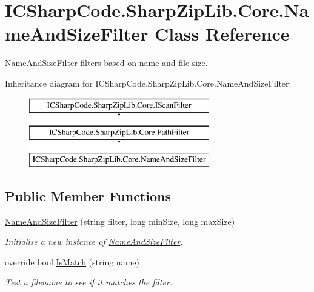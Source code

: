 \hypertarget{class_i_c_sharp_code_1_1_sharp_zip_lib_1_1_core_1_1_name_and_size_filter}{}\section{I\+C\+Sharp\+Code.\+Sharp\+Zip\+Lib.\+Core.\+Name\+And\+Size\+Filter Class Reference}
\label{class_i_c_sharp_code_1_1_sharp_zip_lib_1_1_core_1_1_name_and_size_filter}


\hyperlink{class_i_c_sharp_code_1_1_sharp_zip_lib_1_1_core_1_1_name_and_size_filter}{Name\+And\+Size\+Filter} filters based on name and file size.  


Inheritance diagram for I\+C\+Sharp\+Code.\+Sharp\+Zip\+Lib.\+Core.\+Name\+And\+Size\+Filter\+:\begin{figure}[H]
\begin{center}
\leavevmode
\includegraphics[height=3.000000cm]{class_i_c_sharp_code_1_1_sharp_zip_lib_1_1_core_1_1_name_and_size_filter}
\end{center}
\end{figure}
\subsection*{Public Member Functions}
\begin{DoxyCompactItemize}
\item 
\hyperlink{class_i_c_sharp_code_1_1_sharp_zip_lib_1_1_core_1_1_name_and_size_filter_a79b6320156041b90e0b8d863cb78217b}{Name\+And\+Size\+Filter} (string filter, long min\+Size, long max\+Size)
\begin{DoxyCompactList}\small\item\em Initialise a new instance of \hyperlink{class_i_c_sharp_code_1_1_sharp_zip_lib_1_1_core_1_1_name_and_size_filter}{Name\+And\+Size\+Filter}. \end{DoxyCompactList}\item 
override bool \hyperlink{class_i_c_sharp_code_1_1_sharp_zip_lib_1_1_core_1_1_name_and_size_filter_a90dcfdf271d08f047b386b8c161b264d}{Is\+Match} (string name)
\begin{DoxyCompactList}\small\item\em Test a filename to see if it matches the filter. \end{DoxyCompactList}\end{DoxyCompactItemize}
